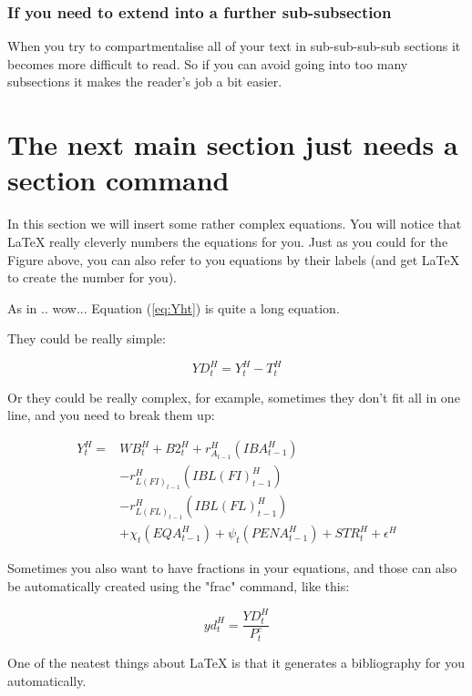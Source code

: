 \documentclass[english,a4paper,12pt]{article}
\begin{document}
\subsubsection{If you need to extend into a further sub-subsection}

When you try to compartmentalise all of your text in sub-sub-sub-sub sections it becomes more difficult to read. So if you can avoid going into too many subsections it makes the reader's job a bit easier.

\section{The next main section just needs a section command}

In this section we will insert some rather complex equations. You will notice that LaTeX really cleverly numbers the equations for you. Just as you could for the Figure above, you can also refer to you equations by their labels (and get LaTeX to create the number for you).

As in .. wow... Equation (\ref{eq:Yht}) is quite a long equation.

They could be really simple:

\begin{equation}
YD^H_t = Y^H_t - T^H_t
\end{equation}

Or they could be really complex, for example, sometimes they don't fit all in one line, and you need to break them up:

\begin{equation}
\begin{split}
Y^H_t = & WB^H_t + B2^H_{t} + r^H_{A_{t-1}}(IBA^H_{t-1})\\
        & - r^H_{L(FI)_{t-1}}(IBL(FI)^H_{t-1})\\
        & - r^H_{L(FL)_{t-1}}(IBL(FL)^H_{t-1})\\
        & + \chi _t(EQA^H_{t-1}) + \psi _t(PENA^H_{t-1}) + STR^H_t + \epsilon ^H
\label{eq:Yht}
\end{split}
\end{equation}

Sometimes you also want to have fractions in your equations, and those can also be automatically created using the "frac" command, like this:

\begin{equation}
yd^H_t = \frac{YD^H_t}{P^c_t}
\end{equation}

One of the neatest things about LaTeX is that it generates a bibliography for you automatically.

\newpage
\linespread{1}


\end{document}
